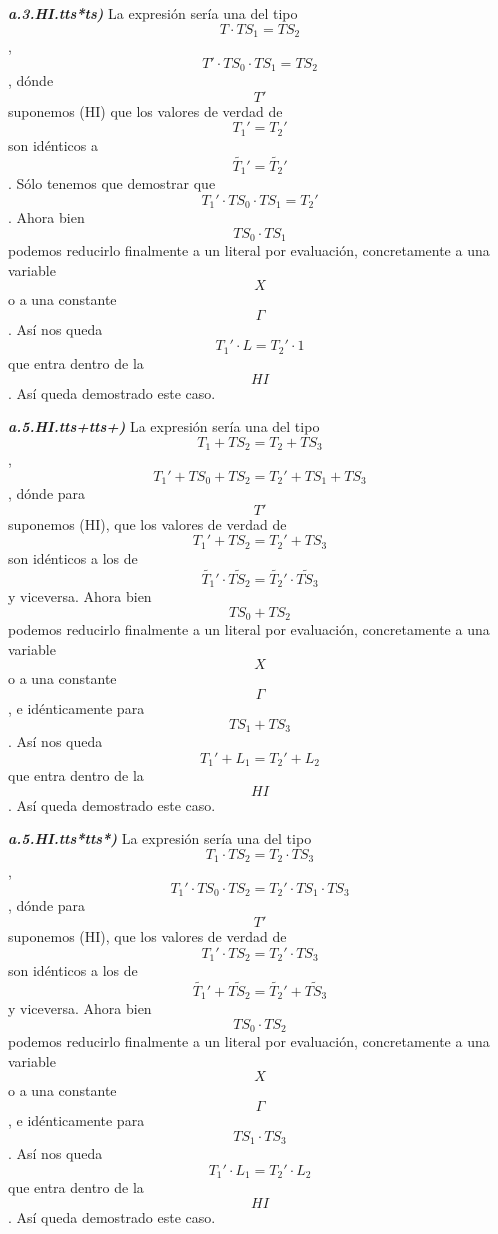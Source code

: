 \begin{enumerate}
\begin{enumerate}
\begin{enumerate}
\begin{enumerate}
\begin{enumerate}
          \emph{\textbf{a.3.HI.tts*ts)}} La expresión sería una del tipo
          \[{T \cdot \mathit{TS}_{1}} = \mathit{TS}_{2}\] ,
          \[T{{{' \cdot \mathit{TS}_{0}} \cdot \mathit{TS}_{1}} = \mathit{TS}_{2}}\],
          dónde \[T'\]suponemos (HI) que los valores de ver\-dad de
          \[T_{1}{' = T_{2}}'\] son idénticos a
          \[\widetilde{T_{1}}{' = \widetilde{T_{2}}}'\]. Sólo tenemos
          que de\-mostrar que
          \[T_{1}{{{' \cdot \mathit{TS}_{0}} \cdot \mathit{TS}_{1}} = T_{2}}'\].
          Ahora bien \[\mathit{TS}_{0} \cdot \mathit{TS}_{1}\] podemos
          reducir\-lo finalmente a un literal por evaluación,
          concretamente a una variable \[X\] o a una constante
          \[\Gamma\]. Así nos queda
          \[T_{1}{{' \cdot L} = T_{2}}{' \cdot 1}\]que entra dentro de
          la \[\mathit{HI}\]. Así queda demostrado este caso.

          \emph{\textbf{a.5.HI.tts+tts+)}} La expresión sería una del
          tipo \[{T_{1} + \mathit{TS}_{2}} = {T_{2} + \mathit{TS}_{3}}\]
          ,
          \[T_{1}{{{' + \mathit{TS}_{0}} + \mathit{TS}_{2}} = T_{2}}{{' + \mathit{TS}_{1}} + \mathit{TS}_{3}}\],
          dónde para \[T'\] suponemos (HI), que los valores de verdad de
          \[T_{1}{{' + \mathit{TS}_{2}} = T_{2}}{' + \mathit{TS}_{3}}\]
          son idénticos a los de
          \[\widetilde{T_{1}}{{' \cdot \widetilde{\mathit{TS}_{2}}} = \widetilde{T_{2}}}{' \cdot \widetilde{\mathit{TS}_{3}}}\]
          y viceversa. Ahora bien \[\mathit{TS}_{0} + \mathit{TS}_{2}\]
          podemos redu\-cirlo finalmente a un literal por evaluación,
          concretamente a una variable \[X\] o a una constante
          \[\Gamma\], e idénticamente para
          \[\mathit{TS}_{1} + \mathit{TS}_{3}\]. Así nos queda
          \[T_{1}{{' + L_{1}} = T_{2}}{' + L_{2}}\]que entra dentro de
          la \[\mathit{HI}\]. Así queda demos\-trado este caso.

          \emph{\textbf{a.5.HI.tts*tts*)}} La expresión sería una del
          tipo
          \[{T_{1} \cdot \mathit{TS}_{2}} = {T_{2} \cdot \mathit{TS}_{3}}\]
          ,
          \[T_{1}{{{' \cdot \mathit{TS}_{0}} \cdot \mathit{TS}_{2}} = T_{2}}{{' \cdot \mathit{TS}_{1}} \cdot \mathit{TS}_{3}}\],
          dónde para \[T'\] suponemos (HI), que los valores de verdad de
          \[T_{1}{{' \cdot \mathit{TS}_{2}} = T_{2}}{' \cdot \mathit{TS}_{3}}\]
          son idénticos a los de
          \[\widetilde{T_{1}}{{' + \widetilde{\mathit{TS}_{2}}} = \widetilde{T_{2}}}{' + \widetilde{\mathit{TS}_{3}}}\]
          y viceversa. Ahora bien
          \[\mathit{TS}_{0} \cdot \mathit{TS}_{2}\] podemos redu\-cirlo
          finalmente a un literal por evaluación, concretamente a una
          variable \[X\] o a una constante \[\Gamma\], e idénticamente
          para \[\mathit{TS}_{1} \cdot \mathit{TS}_{3}\]. Así nos
          que\-da \[T_{1}{{' \cdot L_{1}} = T_{2}}{' \cdot L_{2}}\]que
          entra dentro de la \[\mathit{HI}\]. Así queda demostrado este
          caso.


\end{enumerate}
\end{enumerate}
\end{enumerate}
\end{enumerate}
\end{enumerate}
